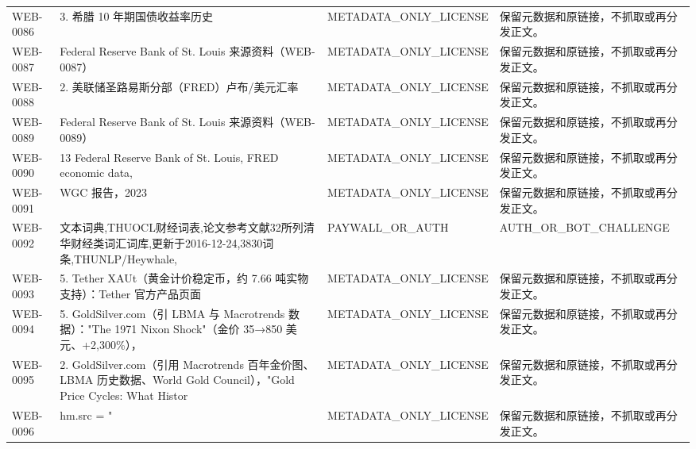 \documentclass[UTF8,openany,oneside,11pt]{ctexbook}
\begin{document}
\begin{longtable}{L{1.5cm}L{5.5cm}L{3cm}L{5cm}}
WEB-\allowbreak{}0086 & 3. 希腊 10 年期国债收益率历史 & METADATA\_\allowbreak{}ONLY\_\allowbreak{}LICENSE & 保留元数据和原链接，不抓取或再分发正文。 \\
WEB-\allowbreak{}0087 & Federal Reserve Bank of St. Louis 来源资料（WEB-\allowbreak{}0087） & METADATA\_\allowbreak{}ONLY\_\allowbreak{}LICENSE & 保留元数据和原链接，不抓取或再分发正文。 \\
WEB-\allowbreak{}0088 & 2. 美联储圣路易斯分部（FRED）卢布/\allowbreak{}美元汇率 & METADATA\_\allowbreak{}ONLY\_\allowbreak{}LICENSE & 保留元数据和原链接，不抓取或再分发正文。 \\
WEB-\allowbreak{}0089 & Federal Reserve Bank of St. Louis 来源资料（WEB-\allowbreak{}0089） & METADATA\_\allowbreak{}ONLY\_\allowbreak{}LICENSE & 保留元数据和原链接，不抓取或再分发正文。 \\
WEB-\allowbreak{}0090 & 13 Federal Reserve Bank of St. Louis,\allowbreak{} FRED economic data,\allowbreak{} & METADATA\_\allowbreak{}ONLY\_\allowbreak{}LICENSE & 保留元数据和原链接，不抓取或再分发正文。 \\
WEB-\allowbreak{}0091 & WGC 报告，2023 & METADATA\_\allowbreak{}ONLY\_\allowbreak{}LICENSE & 保留元数据和原链接，不抓取或再分发正文。 \\
WEB-\allowbreak{}0092 & 文本词典,\allowbreak{}THUOCL财经词表,\allowbreak{}论文参考文献32所列清华财经类词汇词库,\allowbreak{}更新于2016-\allowbreak{}12-\allowbreak{}24,\allowbreak{}3830词条,\allowbreak{}THUNLP/\allowbreak{}Heywhale,\allowbreak{} & PAYWALL\_\allowbreak{}OR\_\allowbreak{}AUTH & AUTH\_\allowbreak{}OR\_\allowbreak{}BOT\_\allowbreak{}CHALLENGE \\
WEB-\allowbreak{}0093 & 5. Tether XAUt（黄金计价稳定币，约 7.66 吨实物支持）：Tether 官方产品页面 & METADATA\_\allowbreak{}ONLY\_\allowbreak{}LICENSE & 保留元数据和原链接，不抓取或再分发正文。 \\
WEB-\allowbreak{}0094 & 5. GoldSilver.com（引 LBMA 与 Macrotrends 数据）："The 1971 Nixon Shock"（金价 35→850 美元、+2,\allowbreak{}300\%）， & METADATA\_\allowbreak{}ONLY\_\allowbreak{}LICENSE & 保留元数据和原链接，不抓取或再分发正文。 \\
WEB-\allowbreak{}0095 & 2. GoldSilver.com（引用 Macrotrends 百年金价图、LBMA 历史数据、World Gold Council），"Gold Price Cycles:\allowbreak{} What Histor & METADATA\_\allowbreak{}ONLY\_\allowbreak{}LICENSE & 保留元数据和原链接，不抓取或再分发正文。 \\
WEB-\allowbreak{}0096 & hm.src = " & METADATA\_\allowbreak{}ONLY\_\allowbreak{}LICENSE & 保留元数据和原链接，不抓取或再分发正文。 \\

\end{longtable}
\end{document}
